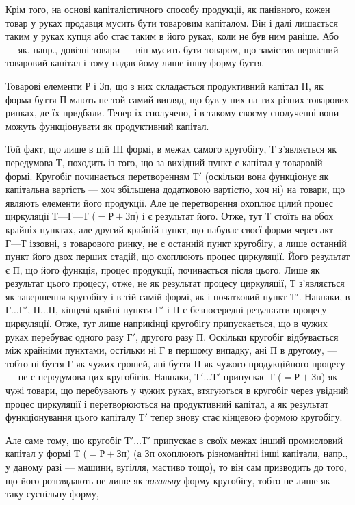 Крім того, на основі капіталістичного способу продукції, як панівного, кожен товар у руках продавця
мусить бути товаровим капіталом. Він і далі лишається таким у руках купця або стає таким в його
руках, коли не був ним раніше. Або — як, напр., довізні товари — він мусить бути товаром, що
замістив первісний товаровий капітал і тому надав йому лише іншу форму буття.

Товарові елементи $Р$ і $Зп$, що з них складається продуктивний капітал $П$, як форма буття $П$ мають не той
самий вигляд, що був у них на тих різних товарових ринках, де їх придбали. Тепер їх сполучено, і в
такому своєму сполученні вони можуть функціонувати як продуктивний капітал.

Той факт, що лише в цій III формі, в межах самого кругобігу, $Т$ з’являється як передумова $Т$, походить
із того, що за вихідний пункт є капітал у товаровій формі. Кругобіг починається перетворенням $Т'$
(оскільки вона функціонує як капітальна вартість — хоч збільшена додатковою вартістю, хоч ні) на
товари, що являють елементи його продукції. Але це перетворення охоплює цілий процес циркуляції $Т —
Г — Т$ ($= Р+Зп$) і є результат його. Отже, тут $Т$ стоїть на обох крайніх пунктах, але другий крайній
пункт, що набуває своєї форми через акт $Г — Т$ іззовні,
з товарового ринку, не є останній пункт кругобігу, а лише останній пункт його двох
перших стадій, що охоплюють процес циркуляції. Його результат є $П$, що його функція, процес
продукції, починається після цього. Лише як результат цього процесу, отже, не як результат процесу
циркуляції, $Т$ з’являється як завершення кругобігу і в тій самій формі, як і початковий пункт $Т'$.
Навпаки, в $Г\dots{} Г'$, $П\dots{} П$, кінцеві крайні пункти $Г'$ і $П$ є безпосередні результати процесу
циркуляції. Отже, тут лише наприкінці кругобігу припускається, що в чужих руках перебуває одного
разу $Г'$, другого разу $П$. Оскільки кругобіг відбувається між крайніми пунктами, остільки ні $Г$ в
першому випадку, ані $П$ в другому, — тобто ні буття $Г$ як чужих грошей, ані буття $П$ як чужого
продукційного процесу — не є передумова цих кругобігів. Навпаки, $Т'\dots{} Т'$ припускає $Т$ ($= Р+Зп$) як
чужі товари,
що перебувають у чужих руках, втягуються в кругобіг через увідний процес циркуляції і перетворюються
на продуктивний капітал, а як результат функціонування цього капіталу $Т'$ тепер знову стає кінцевою
формою кругобігу.

Але саме тому, що кругобіг $Т'\dots{} Т'$ припускає в своїх межах інший промисловий капітал у формі
$Т$ ($=Р+Зп$) (а $Зп$ охоплюють різноманітні інші капітали, напр., у даному разі — машини, вугілля, мастиво
тощо), то він сам призводить до того, що його розглядають не лише як \emph{загальну} форму кругобігу, тобто
не лише як таку суспільну форму,
\parbreak{}  %
